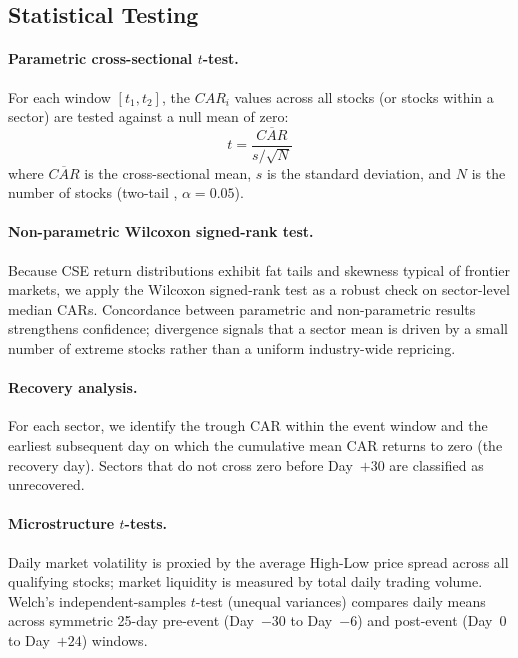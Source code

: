 \documentclass[sigconf, nonacm]{acmart}
\begin{document}
\subsection{Statistical Testing}

\paragraph{Parametric cross-sectional $t$-test.}
For each window $[t_1,t_2]$, the $CAR_i$ values across all stocks (or
stocks within a sector) are tested against a null mean of zero:
\begin{equation}
  t = \frac{\overline{CAR}}{s / \sqrt{N}}
\end{equation}
where $\overline{CAR}$ is the cross-sectional mean, $s$ is the standard
deviation, and $N$ is the number of stocks (two-tail , $\alpha=0.05$).

\paragraph{Non-parametric Wilcoxon signed-rank test.}
Because CSE return distributions exhibit fat tails and skewness typical of
frontier markets, we apply the Wilcoxon signed-rank test as a robust check
on sector-level median CARs. Concordance between parametric and
non-parametric results strengthens confidence; divergence signals that a
sector mean is driven by a small number of extreme stocks rather than a
uniform industry-wide repricing.

\paragraph{Recovery analysis.}
For each sector, we identify the trough CAR within the event window and the
earliest subsequent day on which the cumulative mean CAR returns to zero
(the recovery day). Sectors that do not cross zero before Day~$+30$ are
classified as unrecovered.

\paragraph{Microstructure $t$-tests.}
Daily market volatility is proxied by the average High-Low price spread
across all qualifying stocks; market liquidity is measured by total daily
trading volume. Welch's independent-samples $t$-test (unequal variances)
compares daily means across symmetric 25-day pre-event (Day~$-30$ to
Day~$-6$) and post-event (Day~0 to Day~$+24$) windows.
\end{document}
